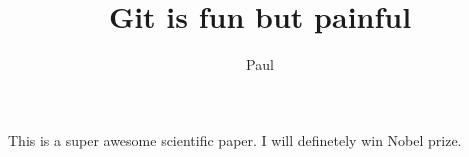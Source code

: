 \documentclass[10pt]{article}
\author{Paul}
\title{Git is fun but painful}
\begin{document}
	\maketitle

	This is a super awesome scientific paper.
	I will definetely win Nobel prize.
\end{document}
